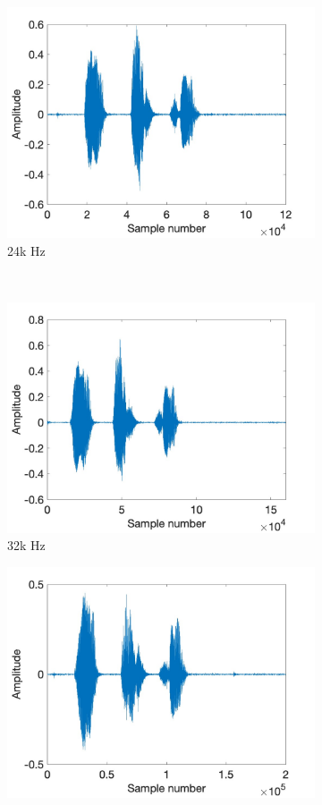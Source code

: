 \documentclass[11pt, oneside]{article}   	%
\begin{document}
\begin{figure}[ht]
\begin{subfigure}[b]{0.3\textwidth}
\includegraphics[width=\textwidth]{imgs/24k-amplitude.jpg}
\caption{24k Hz}
\end{subfigure}\\
\begin{subfigure}[b]{0.3\textwidth}
\includegraphics[width=\textwidth]{imgs/32k-amplitude.jpg}
\caption{32k Hz}
\end{subfigure}
\begin{subfigure}[b]{0.3\textwidth}
\includegraphics[width=\textwidth]{imgs/40k-amplitude.jpg}

\end{subfigure}
\end{figure}
\end{document}
